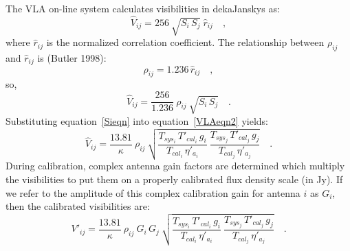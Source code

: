 \documentclass[11pt]{article}
\begin{document}
The VLA on-line system calculates visibilities in dekaJanskys as:
\begin{equation}
\label{VLAeqn}
   \hat{V}_{ij} = 256 \ \sqrt{S_i \, S_j} \ \hat{r}_{ij} \quad ,
\end{equation}
where $\hat{r}_{ij}$ is the normalized correlation coefficient.  The
relationship between $\rho_{ij}$ and $\hat{r}_{ij}$ is (Butler 1998):
\begin{equation}
   \rho_{ij} = 1.236 \, \hat{r}_{ij} \quad ,
\end{equation}
so,
\begin{equation}
\label{VLAeqn2}
   \hat{V}_{ij} = \frac{256}{1.236} \ \rho_{ij} \ \sqrt{S_i \, S_j}
   \quad .
\end{equation}
Substituting equation~\ref{Sieqn} into equation~\ref{VLAeqn2} yields:
\begin{equation}
\label{VLAeqn3}
   \hat{V}_{ij} = \frac{13.81}{\kappa} \ \rho_{ij} \
      \sqrt{\frac{T_{sys_i} \, T'_{cal_i} \, g_i}
                 {T_{cal_i} \, \eta'_{a_i}} \
            \frac{T_{sys_j} \, T'_{cal_j} \, g_j}
                 {T_{cal_j} \, \eta'_{a_j}} } \quad .
\end{equation}
During calibration, complex antenna gain factors are determined which
multiply the visibilities to put them on a properly calibrated flux
density scale (in Jy).  If we refer to the amplitude of this complex
calibration gain for antenna $i$ as $G_i$, then the calibrated
visibilities are:
\begin{equation}
\label{VLAeqn4}
   V'_{ij} = \frac{13.81}{\kappa} \ \rho_{ij} \ G_i \, G_j \
             \sqrt{\frac{T_{sys_i} \, T'_{cal_i} \, g_i}
                        {T_{cal_i} \, \eta'_{a_i}} \
                   \frac{T_{sys_j} \, T'_{cal_j} \, g_j}
                        {T_{cal_j} \, \eta'_{a_j}} }
\quad .
\end{equation}
\end{document}
